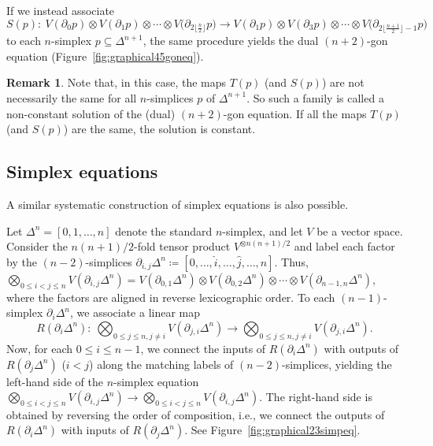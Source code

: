 \documentclass[10pt,a4paper]{amsart}
\numberwithin{equation}{section}
\theoremstyle{definition}
\newtheorem{Remark}[Theorem]{Remark}
\begin{document}
If we instead associate
\begin{equation*}
 S(p)\colon \ V(\partial_0 p)\otimes V(\partial_1 p)\otimes\cdots\otimes V\bigl(\partial_{2\lfloor\frac{n}{2}\rfloor} p\bigr)\to V(\partial_1 p)\otimes V(\partial_3 p)\otimes\cdots\otimes V\bigl(\partial_{2\lfloor\frac{n+1}{2}\rfloor-1} p\bigr)
\end{equation*}
to each $n$-simplex $p\subseteq\Delta^{n+1}$, the same procedure yields the dual $(n+2)$-gon equation (Figure~\ref{fig:graphical45goneq}).

\begin{Remark}
 Note that, in this case, the maps $T(p)$ (and $S(p)$) are not necessarily the same for all $n$-simplices $p$ of $\Delta^{n+1}$. So such a family is called a non-constant solution of the (dual) $(n+2)$-gon equation. If all the maps $T(p)$ (and $S(p)$) are the same, the solution is constant.
\end{Remark}



\subsection{Simplex equations}

A similar systematic construction of simplex equations is also possible.

Let $\Delta^n=[0,1,\dots,n]$ denote the standard $n$-simplex, and let $V$ be a vector space.
Consider the $n(n+1)/2$-fold tensor product $V^{\otimes n(n+1)/2}$ and label each factor by the $(n-2)$-simplices $\partial_{i,j}\Delta^n\coloneqq [0,\dots,\hat{i},\dots,\hat{j},\dots, n]$. Thus, $\bigotimes_{0\leq i<j\leq n}V(\partial_{i,j}\Delta^n) = V(\partial_{0,1}\Delta^n)\otimes V(\partial_{0,2}\Delta^n)\otimes\cdots\otimes V(\partial_{n-1,n}\Delta^n)$, where the factors are aligned in reverse lexicographic order. To each $(n-1)$-simplex $\partial_i\Delta^{n}$, we associate a linear map
\begin{equation*}
 R(\partial_i\Delta^{n}) \colon \ \bigotimes_{0\leq j \leq n, j\neq i} V(\partial_{j,i} \Delta^n) \to \bigotimes_{0\leq j \leq n, j\neq i} V(\partial_{j,i} \Delta^n).
\end{equation*}
Now, for each $0 \leq i \leq n-1$, we connect the inputs of $R(\partial_i\Delta^{n})$ with outputs of $R(\partial_j\Delta^{n})$ ($i<j$) along the matching labels of $(n-2)$-simplices, yielding the left-hand side of the $n$-simplex equation $\bigotimes_{0\leq i<j\leq n}V(\partial_{i,j}\Delta^n) \to \bigotimes_{0\leq i<j\leq n}V(\partial_{i,j}\Delta^n)$. The right-hand side is obtained by reversing the order of composition, i.e., we connect the outputs of $R(\partial_i\Delta^{n})$ with inputs of $R(\partial_j\Delta^{n})$. See Figure~\ref{fig:graphical23simpeq}.
\end{document}
